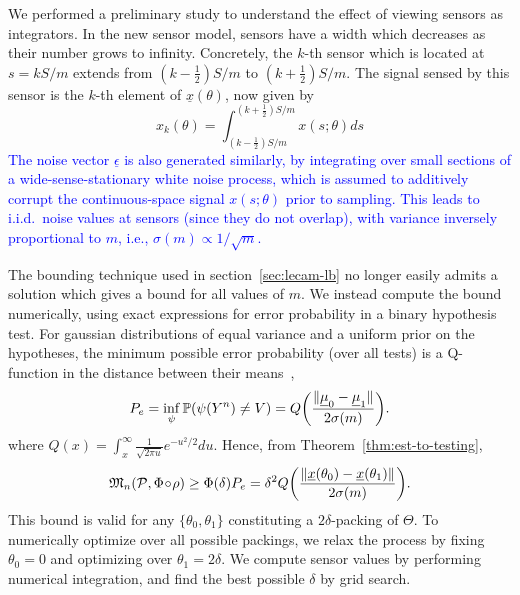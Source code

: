 \documentclass[conference]{IEEEtran}
\providecommand{\v}{}
\renewcommand{\v}[1]{\underline{#1}}
\DeclarePairedDelimiter\norm{\lVert}{\rVert}
\newcommand{\Phiorho}{\Phi\!\circ\!\rho}
\begin{document}
We performed a preliminary study to understand the effect of viewing sensors as
integrators. In the new sensor model, sensors have a width which decreases as
their number grows to infinity. Concretely, the $k$-th sensor which is located
at $s = kS/m$ extends from $(k{-}\frac{1}{2})S/m$ to $(k{+}\frac{1}{2})S/m$.
The signal sensed by this sensor is the $k$-th element of $\v x(\theta)$, now
given by
\begin{equation}
	x_k(\theta) = \int_{(k-\frac{1}{2})S/m}^{(k+\frac{1}{2})S/m} x(s;\theta) ds
\end{equation}
\textcolor{blue}{
The noise vector $\v \epsilon$ is also generated similarly, by integrating over
small sections of a wide-sense-stationary white noise process, which is assumed
to additively corrupt the continuous-space signal $x(s;\theta)$ prior to
sampling. This leads to i.i.d.\ noise values at sensors (since they do not
overlap), with variance inversely proportional to $m$, i.e., $\sigma(m) \propto
1/\sqrt{m}$.
}

The bounding technique used in section~\ref{sec:lecam-lb} no longer easily
admits a solution which gives a bound for all values of $m$. We instead compute
the bound numerically, using exact expressions for error probability in a
binary hypothesis test. For gaussian distributions of equal variance and a
uniform prior on the hypotheses, the minimum possible error probability (over
all tests) is a Q-function in the distance between their
means~\cite{NPLemmaOrSimilar},
\begin{equation}
	P_e = \inf_\psi \mathbb P(\psi(Y^n) \neq V) = Q\bigg(\frac{\norm{\v\mu_0 - \v\mu_1}}{2\sigma(m)}\bigg).
\end{equation}
where $Q(x) = \int_x^\infty \frac{1}{\sqrt{2\pi u}} e^{-u^2/2} du$. Hence, from
Theorem~\ref{thm:est-to-testing},
\begin{equation}
	\mathfrak{M}_n(\mathcal{P}, \Phiorho) \geq \Phi(\delta) P_e = \delta^2 Q\bigg(\frac{\norm{\v x(\theta_0) - \v x(\theta_1)}}{2\sigma(m)}\bigg).
\end{equation}
This bound is valid for any $\{\theta_0, \theta_1\}$ constituting a
$2\delta$-packing of $\Theta$. To numerically optimize over all possible
packings, we relax the process by fixing $\theta_0 = 0$ and optimizing over
$\theta_1 = 2\delta$.  We compute sensor values by performing numerical
integration, and find the best possible $\delta$ by grid search.

\end{document}
